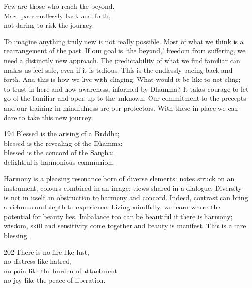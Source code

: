 

\begin{dhpVerse}{85}
\label{dhp-85}
Few are those who reach the beyond.\\
Most pace endlessly back and forth,\\
not daring to risk the journey.
\end{dhpVerse}

\begin{dhpRefl}
To imagine anything truly new is not really possible. Most of what we think is a rearrangement of the past. If our goal is `the beyond,' freedom from suffering, we need a distinctly new approach. The predictability of what we find familiar can makes us feel safe, even if it is tedious. This is the endlessly pacing back and forth. And this is how we live with clinging. What would it be like to not-cling; to trust in here-and-now awareness, informed by Dhamma? It takes courage to let go of the familiar and open up to the unknown. Our commitment to the precepts and our training in mindfulness are our protectors. With these in place we can dare to take this new journey.
\end{dhpRefl}


\begin{dhpVerse}{194}
\label{dhp-194}
Blessed is the arising of a Buddha;\\
blessed is the revealing of the Dhamma;\\
blessed is the concord of the Sangha;\\
delightful is harmonious communion.
\end{dhpVerse}

\begin{dhpRefl}
Harmony is a pleasing resonance born of diverse elements: notes struck on an instrument; colours combined in an image; views shared in a dialogue. Diversity is not in itself an obstruction to harmony and concord. Indeed, contrast can bring a richness and depth to experience. Living mindfully, we learn where the potential for beauty lies. Imbalance too can be beautiful if there is harmony; wisdom, skill and sensitivity come together and beauty is manifest. This is a rare blessing.
\end{dhpRefl}


\begin{dhpVerse}{202}
\label{dhp-202}
There is no fire like lust,\\
no distress like hatred,\\
no pain like the burden of attachment,\\
no joy like the peace of liberation.
\end{dhpVerse}

